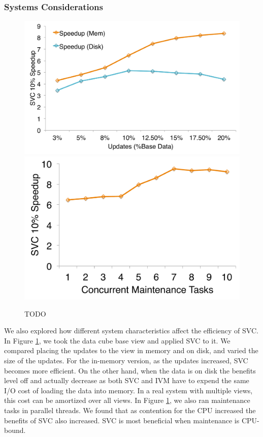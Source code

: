 \subsubsection{Systems Considerations}
\begin{figure}[t]
\centering
 \includegraphics[scale=0.14]{exp/mssd_2.pdf}
 \includegraphics[scale=0.14]{exp/mssd_1.pdf}

 \caption{TODO \label{exp6-sys}}
\end{figure}

We also explored how different system characteristics affect the efficiency of SVC.
In Figure \ref{exp6-sys}, we took the data cube base view and applied SVC to it.
We compared placing the updates to the view in memory and on disk, and varied the size of the updates.
For the in-memory version, as the updates increased, SVC becomes more efficient.
On the other hand, when the data is on disk the benefits level off and actually decrease as both SVC and IVM have to 
expend the same I/O cost of loading the data into memory.
In a real system with multiple views, this cost can be amortized over all views.
In Figure \ref{exp6-sys}, we also ran maintenance tasks in parallel threads.
We found that as contention for the CPU increased the benefits of SVC also increased.
SVC is most beneficial when maintenance is CPU-bound.

